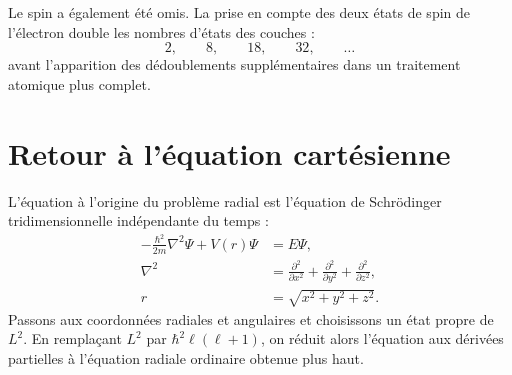 Le spin a également été omis. La prise en compte des deux états de spin de l’électron double les nombres d’états des couches :
\begin{equation}
2,\qquad 8,\qquad 18,\qquad 32,\qquad \ldots
\end{equation}
avant l’apparition des dédoublements supplémentaires dans un traitement atomique plus complet.

\section{Retour à l’équation cartésienne}

L’équation à l’origine du problème radial est l’équation de Schr\"odinger tridimensionnelle indépendante du temps :
\begin{equation}
\begin{aligned}
-\frac{\hbar^2}{2m}\nabla^2\Psi+V(r)\Psi&=E\Psi,\\
\nabla^2&=\frac{\partial^2}{\partial x^2}
+\frac{\partial^2}{\partial y^2}
+\frac{\partial^2}{\partial z^2},\\
r&=\sqrt{x^2+y^2+z^2}.
\end{aligned}
\end{equation}
Passons aux coordonnées radiales et angulaires et choisissons un état propre de \(L^2\).
En remplaçant \(L^2\) par \(\hbar^2\ell(\ell+1)\), on réduit alors l’équation aux dérivées partielles à l’équation radiale ordinaire obtenue plus haut.

\begin{classroomqa}\end{classroomqa}

\begin{classroomqa}\end{classroomqa}

